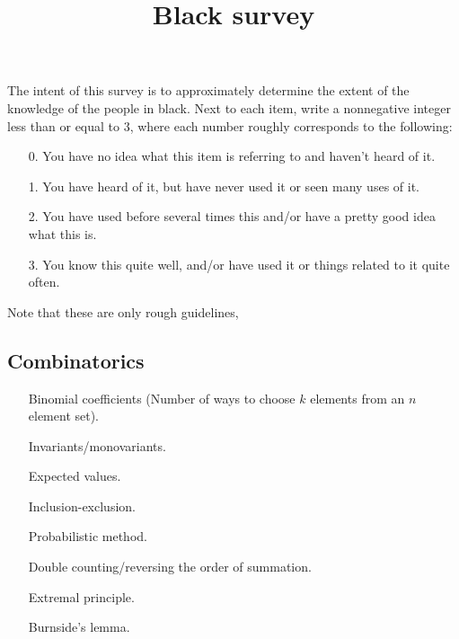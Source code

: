 \documentclass{article}
\begin{document}
\title{Black survey}
\date{}
\maketitle
\section*{}
The intent of this survey is to approximately determine the extent of the knowledge of the people in black. Next to each item, write
a nonnegative integer less than or equal to $3$, where each number roughly corresponds to the following:
\begin{enumerate}
\item[0.] You have no idea what this item is referring to and haven't heard of it.
\item[1.] You have heard of it, but have never used it or seen many uses of it.
\item[2.] You have used before several times this and/or have a pretty good idea what this is.
\item[3.] You know this quite well, and/or have used it or things related to it quite often.
\end{enumerate}

Note that these are only rough guidelines, 
\subsection*{Combinatorics}
\begin{enumerate}
\item[\underline{\hspace{0.4cm}}] Binomial coefficients (Number of ways to choose $k$ elements from an $n$ element set).
\item[\underline{\hspace{0.4cm}}] Invariants/monovariants.
\item[\underline{\hspace{0.4cm}}] Expected values.
\item[\underline{\hspace{0.4cm}}] Inclusion-exclusion.
\item[\underline{\hspace{0.4cm}}] Probabilistic method.
\item[\underline{\hspace{0.4cm}}] Double counting/reversing the order of summation.
\item[\underline{\hspace{0.4cm}}] Extremal principle.
\item[\underline{\hspace{0.4cm}}] Burnside's lemma.
\end{enumerate}
\end{document}
